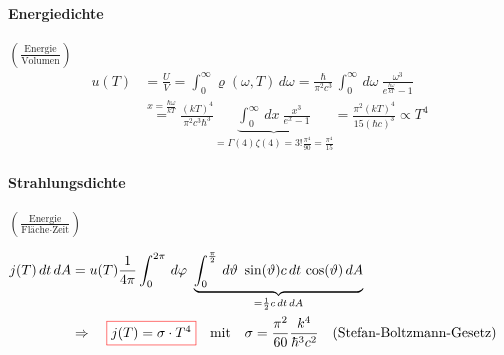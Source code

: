 \paragraph{Energiedichte} $\left(\frac{\text{Energie}}{\text{Volumen}}\right)$
\begin{align}
    u(T) &= \frac{U}{V}= \int_0^{\infty} \varrho(\omega,T) \, d\omega = \frac{\hbar}{\pi^2 c^3}\, \int_0^{\infty} \, d\omega \ \frac{\omega^3}{e^{\frac{\hbar\omega}{kT}}-1}\\
    &\stackrel{x=\frac{\hbar\omega}{kT}}{=} \frac{(kT)^4}{\pi^2c^3\hbar^3} \underbrace{\int_0^{\infty} \, dx \ \frac{x^3}{e^x-1}}_{=\Gamma(4)\zeta(4) = 3! \frac{\pi^4}{90}=\frac{\pi^4}{15}} = \frac{\pi^2(kT)^4}{15 (\hbar c)^3} \propto T^4
\end{align}
\paragraph{Strahlungsdichte} $\left(\frac{\text{Energie}}{\text{Fläche}\cdot\text{Zeit}}\right)$
\begin{center}
\end{center}
\begin{align}
    j(T) \,dt\,dA &= u(T) \frac{1}{4\pi} \int_0^{2\pi} \,d\varphi \ \underbrace{\int_0^{\frac{\pi}{2}} \, d\vartheta \ \sin(\vartheta) c \,dt\, \cos(\vartheta)\,dA}_{=\frac{1}{2} c \,dt\,dA} \\
    &\Rightarrow \quad \fcolorbox{red}{white}{$j(T)=\sigma \cdot T^4$} \qq{mit} \sigma = \frac{\pi^2}{60} \frac{k^4}{\hbar^3c^2} \qq{(Stefan-Boltzmann-Gesetz)}
\end{align}

